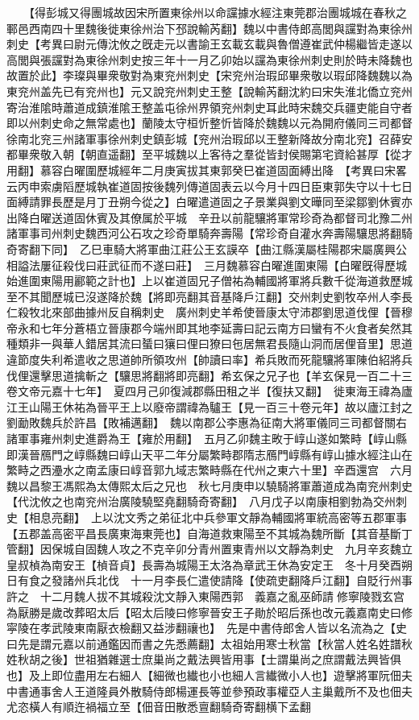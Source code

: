 　　【得彭城又得團城故因宋所置東徐州以命讜據水經注東莞郡治團城城在春秋之鄆邑西南四十里魏後徙東徐州治下邳說輸芮翻】魏以中書侍郎高閭與讜對為東徐州刺史【考異曰尉元傳沈攸之旣走元以書諭王玄載玄載與魯僧遵崔武仲楊繼皆走遂以高閭與張讜對為東徐州刺史按三年十一月乙卯始以讜為東徐州刺史則於時未降魏也故置於此】李璨與畢衆敬對為東兖州刺史【宋兖州治瑕邱畢衆敬以瑕邱降魏魏以為東兖州盖先已有兖州也】元又說兖州刺史王整【說輸芮翻沈約曰宋失淮北僑立兖州寄治淮隂時蕭道成鎮淮隂王整盖屯徐州界領兖州刺史耳此時宋魏交兵疆吏能自守者即以州刺史命之無常處也】蘭陵太守桓忻整忻皆降於魏魏以元為開府儀同三司都督徐南北兖三州諸軍事徐州刺史鎮彭城【兖州治瑕邱以王整新降故分南北兖】召薛安都畢衆敬入朝【朝直遥翻】至平城魏以上客待之羣從皆封侯賜第宅資給甚厚【從才用翻】慕容白曜圍歷城經年二月庚寅拔其東郭癸巳崔道固面縛出降　【考異曰宋畧云丙申索虜䧟歷城執崔道固按後魏列傳道固表云以今月十四日臣東郭失守以十七日面縛請罪長歷是月丁丑朔今從之】白曜遣道固之子景業與劉文曄同至梁鄒劉休賓亦出降白曜送道固休賓及其僚属於平城　辛丑以前龍驤將軍常珍奇為都督司北豫二州諸軍事司州刺史魏西河公石攻之珍奇單騎奔壽陽【常珍奇自灌水奔壽陽驤思將翻騎奇寄翻下同】　乙巳車騎大將軍曲江莊公王玄謨卒【曲江縣漢屬桂陽郡宋屬廣興公相謚法屢征殺伐曰莊武征而不遂曰莊】　三月魏慕容白曜進圍東陽【白曜旣得歷城始進圍東陽用酈範之計也】上以崔道固兄子僧祐為輔國將軍將兵數千從海道救歷城至不其聞歷城已沒遂降於魏【將即亮翻其音基降戶江翻】交州刺史劉牧卒州人李長仁殺牧北來部曲據州反自稱刺史　廣州刺史羊希使晉康太守沛郡劉思道伐俚【晉穆帝永和七年分蒼梧立晉康郡今端州即其地李延壽曰記云南方曰蠻有不火食者矣然其種類非一與華人錯居其流曰蜑曰獽曰俚曰獠曰㐌居無君長隨山洞而居俚音里】思道違節度失利希遣收之思道帥所領攻州【帥讀曰率】希兵敗而死龍驤將軍陳伯紹將兵伐俚還擊思道擒斬之【驤思將翻將即亮翻】希玄保之兄子也【羊玄保見一百二十三卷文帝元嘉十七年】　夏四月己卯復減郡縣田租之半【復扶又翻】　徙東海王禕為廬江王山陽王休祐為晉平王上以廢帝謂禕為驢王【見一百三十卷元年】故以廬江封之　劉勔敗魏兵於許昌【敗補邁翻】　魏以南郡公李惠為征南大將軍儀同三司都督關右諸軍事雍州刺史進爵為王【雍於用翻】　五月乙卯魏主畋于崞山遂如繁畤【崞山縣即漢晉鴈門之崞縣魏曰崞山天平二年分屬繁畤郡隋志鴈門崞縣有崞山據水經注山在繁畤之西灅水之南孟康曰崞音郭九域志繁畤縣在代州之東六十里】辛酉還宫　六月魏以昌黎王馮熙為太傳熙太后之兄也　秋七月庚申以驍騎將軍蕭道成為南兖州刺史【代沈攸之也南兖州治廣陵驍堅堯翻騎奇寄翻】　八月戊子以南康相劉勃為交州刺史【相息亮翻】　上以沈文秀之弟征北中兵參軍文靜為輔國將軍統高密等五郡軍事【五郡盖高密平昌長廣東海東莞也】自海道救東陽至不其城為魏所斷【其音基斷丁管翻】因保城自固魏人攻之不克辛卯分青州置東青州以文靜為刺史　九月辛亥魏立皇叔楨為南安王【楨音貞】長壽為城陽王太洛為章武王休為安定王　冬十月癸酉朔日有食之發諸州兵北伐　十一月李長仁遣使請降【使疏吏翻降戶江翻】自貶行州事許之　十二月魏人拔不其城殺沈文靜入東陽西郭　義嘉之亂巫師請修寧陵戮玄宫為厭勝是歲改葬昭太后【昭太后陵曰修寧晉安王子勛於昭后孫也改元義嘉南史曰修寜陵在孝武陵東南厭衣檢翻又益涉翻禳也】　先是中書侍郎舍人皆以名流為之【史曰先是謂元嘉以前通鑑因而書之先悉薦翻】太祖始用寒士秋當【秋當人姓名姓譜秋姓秋胡之後】世祖猶雜選士庶巢尚之戴法興皆用事【士謂巢尚之庶謂戴法興皆俱也】及上即位盡用左右細人【細微也纎也小也細人言纎微小人也】遊擊將軍阮佃夫中書通事舍人王道隆員外散騎侍郎楊運長等並參預政事權亞人主巢戴所不及也佃夫尤恣橫人有順迕禍福立至【佃音田散悉亶翻騎奇寄翻横下孟翻